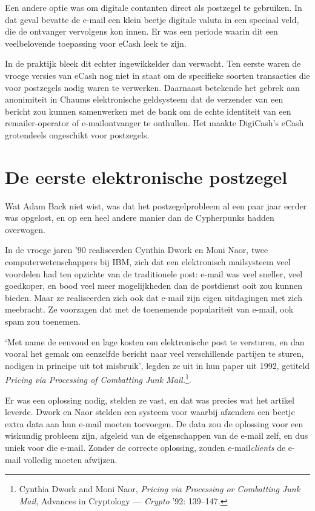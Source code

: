 \documentclass[
  a5paper,
  smalldemyvopaper,11pt,twoside,onecolumn,openright,extrafontsizes,
hidelinks]{memoir}
\begin{document}
Een andere optie was om digitale contanten direct als postzegel te
gebruiken. In dat geval bevatte de e-mail een klein beetje digitale
valuta in een speciaal veld, die de ontvanger vervolgens kon innen. Er
was een periode waarin dit een veelbelovende toepassing voor eCash leek
te zijn.

In de praktijk bleek dit echter ingewikkelder dan verwacht. Ten eerste
waren de vroege versies van eCash nog niet in staat om de specifieke
soorten transacties die voor postzegels nodig waren te verwerken.
Daarnaast betekende het gebrek aan anonimiteit in Chaums elektronische
geldsysteem dat de verzender van een bericht zou kunnen samenwerken met
de bank om de echte identiteit van een remailer-operator of
e-mailontvanger te onthullen. Het maakte DigiCash's eCash grotendeels
ongeschikt voor postzegels.

\section{De eerste elektronische
postzegel}\label{de-eerste-elektronische-postzegel}

Wat Adam Back niet wist, was dat het postzegelprobleem al een paar jaar
eerder was opgelost, en op een heel andere manier dan de Cypherpunks
hadden overwogen.

In de vroege jaren '90 realiseerden Cynthia Dwork en Moni Naor, twee
computerwetenschappers bij IBM, zich dat een elektronisch mailsysteem
veel voordelen had ten opzichte van de traditionele post: e-mail was
veel sneller, veel goedkoper, en bood veel meer mogelijkheden dan de
postdienst ooit zou kunnen bieden. Maar ze realiseerden zich ook dat
e-mail zijn eigen uitdagingen met zich meebracht. Ze voorzagen dat met
de toenemende populariteit van e-mail, ook spam zou toenemen.

`Met name de eenvoud en lage kosten om elektronische post te versturen,
en dan vooral het gemak om eenzelfde bericht naar veel verschillende
partijen te sturen, nodigen in principe uit tot misbruik', legden ze uit
in hun paper uit 1992, getiteld \emph{Pricing via Processing of
Combatting Junk Mail.}\footnote{Cynthia Dwork and Moni Naor,
  \emph{Pricing via Processing or Combatting Junk Mail}, Advances in
  Cryptology --- \emph{Crypto} '92: 139--147.}.

Er was een oplossing nodig, stelden ze vast, en dat was precies wat het
artikel leverde. Dwork en Naor stelden een systeem voor waarbij
afzenders een beetje extra data aan hun e-mail moeten toevoegen. De data
zou de oplossing voor een wiskundig probleem zijn, afgeleid van de
eigenschappen van de e-mail zelf, en dus uniek voor die e-mail. Zonder
de correcte oplossing, zouden e-mail\emph{clients} de e-mail volledig
moeten afwijzen.
\end{document}
